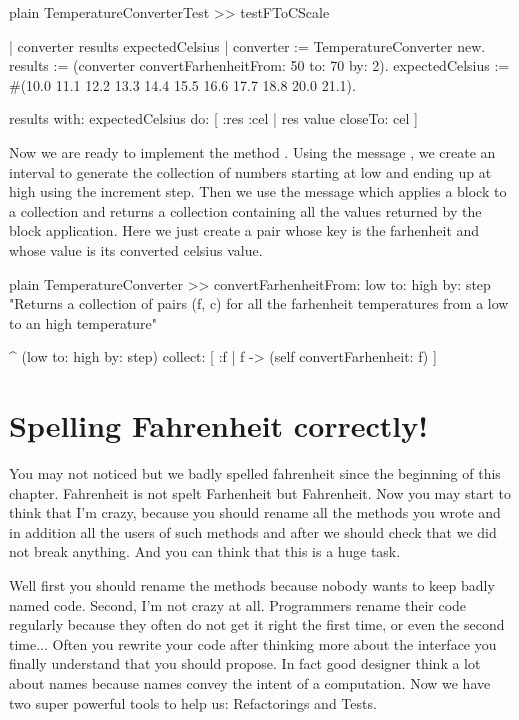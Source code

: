 \documentclass[10pt,twoside,english]{_support/latex/sbabook/sbabook}
\begin{document}
\begin{displaycode}{plain}
TemperatureConverterTest >> testFToCScale

    | converter results expectedCelsius |
    converter := TemperatureConverter new.
    results := (converter convertFarhenheitFrom: 50 to: 70 by: 2).
    expectedCelsius := #(10.0 11.1 12.2 13.3 14.4 15.5 16.6 17.7 18.8 20.0 21.1).

    results with: expectedCelsius
        do: [ :res :cel | res value closeTo: cel ]
\end{displaycode}

Now we are ready to implement the method .
Using the message , we create an interval to generate the collection of numbers starting at low and ending up at high using the increment step. Then we use the message  which applies a block to a collection
and returns a collection containing all the values returned by the block application.
Here we just create a pair whose key is the farhenheit and whose value is its converted celsius value.

\begin{displaycode}{plain}
TemperatureConverter >> convertFarhenheitFrom: low to: high by: step
    "Returns a collection of pairs (f, c) for all the farhenheit temperatures from a low to an high temperature"

    ^ (low to: high by: step)
        collect: [ :f | f -> (self convertFarhenheit: f) ]
\end{displaycode}
\section{Spelling Fahrenheit correctly!}
You may not noticed but we badly spelled fahrenheit since the beginning of this chapter.
Fahrenheit is not spelt Farhenheit but Fahrenheit. Now you may start to think that I'm crazy, because you should rename all the methods you wrote and in addition all the users of such methods and after we should check that we did not break anything. And you can think that this
is a huge task.

 Well first you should rename the methods because nobody wants to keep badly named code. Second, I'm not crazy at all.
Programmers rename their code regularly because they often do not get it right the first time, or even the second time... Often you rewrite your code after thinking more about the interface you finally understand that you should propose. In fact good designer think a lot about names because names convey the intent of a computation. Now we have two super powerful tools to help us: Refactorings and Tests.
\end{document}
